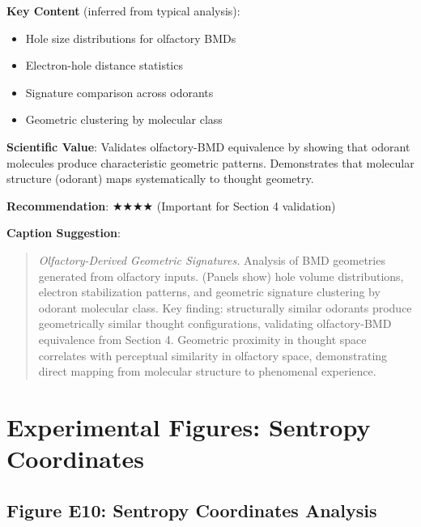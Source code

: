 \documentclass[11pt]{article}
\begin{document}
\textbf{Key Content} (inferred from typical analysis):
\begin{itemize}
\item Hole size distributions for olfactory BMDs
\item Electron-hole distance statistics
\item Signature comparison across odorants
\item Geometric clustering by molecular class
\end{itemize}

\textbf{Scientific Value}:
Validates olfactory-BMD equivalence by showing that odorant molecules produce characteristic geometric patterns. Demonstrates that molecular structure (odorant) maps systematically to thought geometry.

\textbf{Recommendation}: $\bigstar\bigstar\bigstar\bigstar$ (Important for Section 4 validation)

\textbf{Caption Suggestion}:
\begin{quote}
\textit{Olfactory-Derived Geometric Signatures.} Analysis of BMD geometries generated from olfactory inputs. (Panels show) hole volume distributions, electron stabilization patterns, and geometric signature clustering by odorant molecular class. Key finding: structurally similar odorants produce geometrically similar thought configurations, validating olfactory-BMD equivalence from Section 4. Geometric proximity in thought space correlates with perceptual similarity in olfactory space, demonstrating direct mapping from molecular structure to phenomenal experience.
\end{quote}

\newpage

\section{Experimental Figures: Sentropy Coordinates}

\subsection{Figure E10: Sentropy Coordinates Analysis}

\end{document}

